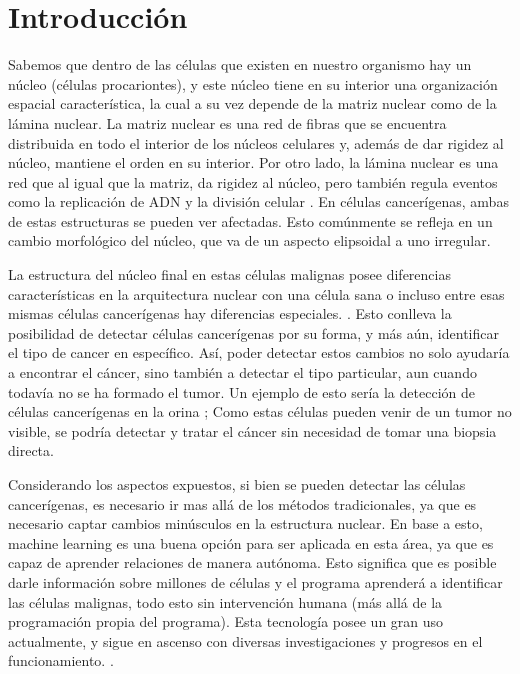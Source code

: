 \documentclass[12pt, letterpaper]{article}
\begin{document}
\newpage

\tableofcontents

\newpage

\section{Introducción}

Sabemos que dentro de las células que existen en nuestro organismo hay un núcleo (células procariontes), y este núcleo tiene en su interior una organización espacial característica, la cual a su vez depende de la matriz nuclear como de la lámina nuclear. La matriz nuclear es una red de fibras que se encuentra distribuida en todo el interior de los núcleos celulares y, además de dar rigidez al núcleo, mantiene el orden en su interior. Por otro lado, la lámina nuclear es una red que al igual que la matriz, da rigidez al núcleo, pero también regula eventos como la replicación de ADN y la división celular \autocite[p.~200]{albertsBiologiaMolecularCelula2010, zinkNuclearStructureCancer2004}. En células cancerígenas, ambas de estas estructuras se pueden ver afectadas. Esto comúnmente se refleja en un cambio morfológico del núcleo, que va de un aspecto elipsoidal a uno irregular. 


La estructura del núcleo final en estas células malignas posee diferencias características en la arquitectura nuclear con una célula sana o incluso entre esas mismas células cancerígenas hay diferencias especiales. \autocite{rynearsonNuclearStructureOrganization2011}. Esto conlleva la posibilidad de detectar células cancerígenas por su forma, y más aún, identificar el tipo de cancer en específico. Así, poder detectar estos cambios no solo ayudaría a encontrar el cáncer, sino también a detectar el tipo particular, aun cuando todavía no se ha formado el tumor. Un ejemplo de esto sería la detección de células cancerígenas en la orina \autocite{UrineCytologyMayo}; Como estas células pueden venir de un tumor no visible, se podría detectar y tratar el cáncer sin necesidad de tomar una biopsia directa.


Considerando los aspectos expuestos, si bien se pueden detectar las células cancerígenas, es necesario ir mas allá de los métodos tradicionales, ya que es necesario captar cambios minúsculos en la estructura nuclear. En base a esto, machine learning es una buena opción para ser aplicada en esta área, ya que es capaz de aprender relaciones de manera autónoma. Esto significa que es posible darle información sobre millones de células y el programa aprenderá a identificar las células malignas, todo esto sin intervención humana (más allá de la programación propia del programa). Esta tecnología posee un gran uso actualmente, y sigue en ascenso con diversas investigaciones y progresos en el funcionamiento. \autocite{kourouMachineLearningApplications2015, carletonAdvancesComputationalMolecular2018}.
\end{document}
